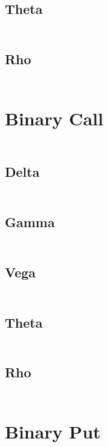 \documentclass[12pt,a4paper]{article}
\begin{document}
\subsection{Theta}
\[
\begin{aligned}  
\end{aligned}
\]
\subsection{Rho}
\[
\begin{aligned}  
\end{aligned}
\]

\section{Binary Call}
\[
\begin{aligned}  
\end{aligned}
\]
\subsection{Delta}
\[
\begin{aligned}  
\end{aligned}
\]
\subsection{Gamma}
\[
\begin{aligned}  
\end{aligned}
\]
\subsection{Vega}
\[
\begin{aligned}  
\end{aligned}
\]
\subsection{Theta}
\[
\begin{aligned}  
\end{aligned}
\]
\subsection{Rho}
\[
\begin{aligned}  
\end{aligned}
\]

\section{Binary Put}
\end{document}

